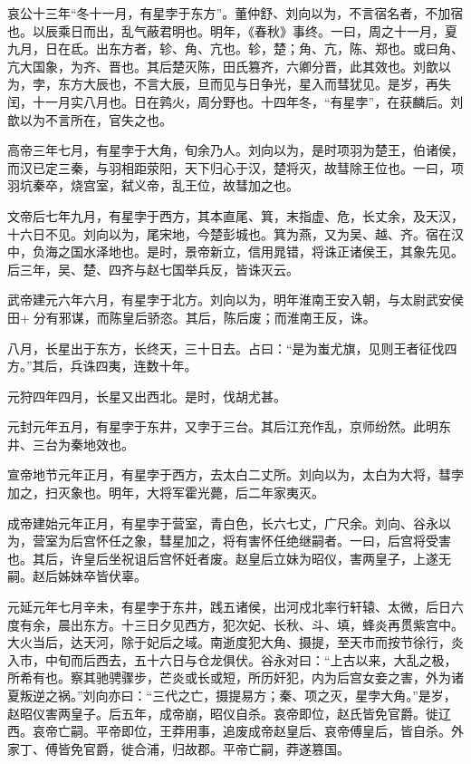 \documentclass[12pt,UTF8]{ctexbook}
\begin{document}
哀公十三年“冬十一月，有星孛于东方”。董仲舒、刘向以为，不言宿名者，不加宿也。以辰乘日而出，乱气蔽君明也。明年，《春秋》事终。一曰，周之十一月，夏九月，日在氐。出东方者，轸、角、亢也。轸，楚；角、亢，陈、郑也。或曰角、亢大国象，为齐、晋也。其后楚灭陈，田氏篡齐，六卿分晋，此其效也。刘歆以为，孛，东方大辰也，不言大辰，旦而见与日争光，星入而彗犹见。是岁，再失闰，十一月实八月也。日在鹑火，周分野也。十四年冬，“有星孛”，在获麟后。刘歆以为不言所在，官失之也。



高帝三年七月，有星孛于大角，旬余乃人。刘向以为，是时项羽为楚王，伯诸侯，而汉已定三秦，与羽相距荥阳，天下归心于汉，楚将灭，故彗除王位也。一曰，项羽坑秦卒，烧宫室，弑义帝，乱王位，故彗加之也。



文帝后七年九月，有星孛于西方，其本直尾、箕，末指虚、危，长丈余，及天汉，十六日不见。刘向以为，尾宋地，今楚彭城也。箕为燕，又为吴、越、齐。宿在汉中，负海之国水泽地也。是时，景帝新立，信用晁错，将诛正诸侯王，其象先见。后三年，吴、楚、四齐与赵七国举兵反，皆诛灭云。



武帝建元六年六月，有星孛于北方。刘向以为，明年淮南王安入朝，与太尉武安侯田+分有邪谋，而陈皇后骄恣。其后，陈后废；而淮南王反，诛。



八月，长星出于东方，长终天，三十日去。占曰：“是为蚩尤旗，见则王者征伐四方。”其后，兵诛四夷，连数十年。



元狩四年四月，长星又出西北。是时，伐胡尤甚。



元封元年五月，有星孛于东井，又孛于三台。其后江充作乱，京师纷然。此明东井、三台为秦地效也。



宣帝地节元年正月，有星孛于西方，去太白二丈所。刘向以为，太白为大将，彗孛加之，扫灭象也。明年，大将军霍光薨，后二年家夷灭。



成帝建始元年正月，有星孛于营室，青白色，长六七丈，广尺余。刘向、谷永以为，营室为后宫怀任之象，彗星加之，将有害怀任绝继嗣者。一曰，后宫将受害也。其后，许皇后坐祝诅后宫怀妊者废。赵皇后立妹为昭仪，害两皇子，上遂无嗣。赵后姊妹卒皆伏辜。



元延元年七月辛未，有星孛于东井，践五诸侯，出河戍北率行轩辕、太微，后日六度有余，晨出东方。十三日夕见西方，犯次妃、长秋、斗、填，蜂炎再贯紫宫中。大火当后，达天河，除于妃后之域。南逝度犯大角、摄提，至天市而按节徐行，炎入市，中旬而后西去，五十六日与仓龙俱伏。谷永对曰：“上古以来，大乱之极，所希有也。察其驰骋骤步，芒炎或长或短，所历奸犯，内为后宫女妾之害，外为诸夏叛逆之祸。”刘向亦曰：“三代之亡，摄提易方；秦、项之灭，星孛大角。”是岁，赵昭仪害两皇子。后五年，成帝崩，昭仪自杀。哀帝即位，赵氏皆免官爵。徙辽西。哀帝亡嗣。平帝即位，王莽用事，追废成帝赵皇后、哀帝傅皇后，皆自杀。外家丁、傅皆免官爵，徙合浦，归故郡。平帝亡嗣，莽遂篡国。
\end{document}
